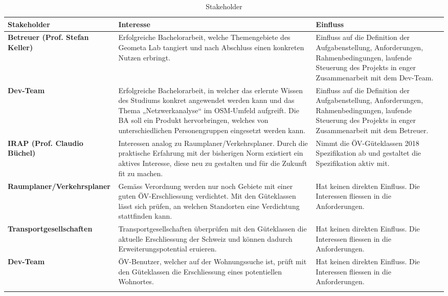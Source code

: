 \begin{landscape}
\begin{longtable}{l p{9cm} p{9cm}}
        \toprule
        \textbf{Stakeholder}
                                & \textbf{Interesse}
                                & \textbf{Einfluss} \\
        \midrule
        \textbf{Betreuer (Prof. Stefan Keller)}
                                & Erfolgreiche Bachelorarbeit, welche Themengebiete des Geometa Lab tangiert und nach Abschluss einen konkreten Nutzen erbringt.
                                & Einfluss auf die Definition der Aufgabenstellung, Anforderungen, Rahmenbedingungen, laufende Steuerung des Projekts in enger Zusammenarbeit mit dem Dev-Team. \\
        \textbf{Dev-Team}
                                & Erfolgreiche Bachelorarbeit, in welcher das erlernte Wissen des Studiums konkret angewendet werden kann und das Thema „Netzwerkanalyse“ im OSM-Umfeld aufgreift. Die BA soll ein Produkt hervorbringen, welches von unterschiedlichen Personengruppen eingesetzt werden kann.
                                & Einfluss auf die Definition der Aufgabenstellung, Anforderungen,  Rahmenbedingungen, laufende Steuerung des Projekts in enger Zusammenarbeit mit dem Betreuer. \\                                
        \textbf{IRAP (Prof. Claudio Büchel)}
                                & Interessen analog zu Raumplaner/Verkehrsplaner. Durch die praktische Erfahrung mit der bisherigen Norm existiert ein aktives Interesse, diese neu zu gestalten und für die Zukunft fit zu machen.
                                & Nimmt die ÖV-Güteklassen 2018 Spezifikation ab und gestaltet die Spezifikation aktiv mit. \\     
        \textbf{Raumplaner/Verkehrsplaner}
                                & Gemäss Verordnung werden nur noch Gebiete mit einer guten ÖV-Erschliessung verdichtet. Mit den Güteklassen lässt sich prüfen, an welchen Standorten eine Verdichtung stattfinden kann.
                                & Hat keinen direkten Einfluss. Die Interessen fliessen in die Anforderungen. \\     
        \textbf{Transportgesellschaften}
                                & Transportgesellschaften überprüfen mit den Güteklassen die aktuelle Erschliessung der Schweiz und können dadurch Erweiterungspotential eruieren.
                                & Hat keinen direkten Einfluss. Die Interessen fliessen in die Anforderungen. \\       
        \textbf{Dev-Team}
                                & ÖV-Benutzer, welcher auf der Wohnungssuche ist, prüft mit den Güteklassen die Erschliessung eines potentiellen Wohnortes.
                                & Hat keinen direkten Einfluss. Die Interessen fliessen in die Anforderungen. \\                                                   
        \bottomrule
    \caption{Stakeholder}
    \label{table:Stakeholder}
\end{longtable}
\end{landscape}

